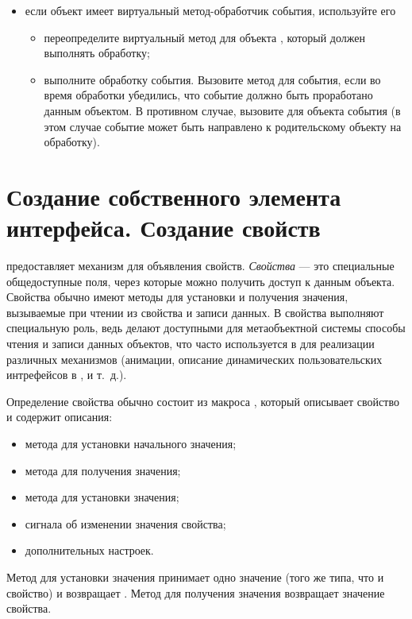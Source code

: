 \begin{itemize}
\item если объект имеет виртуальный метод-обработчик события, используйте его
 \begin{itemize}
 \item переопределите виртуальный метод для объекта , который должен выполнять обработку;
 \item выполните обработку события. Вызовите метод  для события, если во время обработки
 убедились, что событие должно быть проработано данным объектом. В противном случае, вызовите 
 для объекта события (в этом случае событие может быть направлено к родительскому объекту на обработку).
 \end{itemize}
\end{itemize}

\section[Создание собственного элемента интерфейса]{Создание собственного элемента интерфейса. Создание свойств}
 предоставляет механизм для объявления свойств.
\emph{Свойства} --- это специальные общедоступные поля, через которые
можно получить доступ к данным объекта. Свойства обычно имеют методы для установки и получения значения, вызываемые при
чтении из свойства и записи данных. В  свойства выполняют специальную роль, ведь делают доступными для метаобъектной
системы способы чтения и записи данных объектов, что часто используется в  для реализации различных механизмов
(анимации, описание динамических пользовательских интрефейсов в , и т.~д.).

Определение свойства обычно состоит из макроса , который описывает свойство и содержит описания:
\begin{itemize}
\item метода для установки начального значения;
\item метода для получения значения;
\item метода для установки значения;
\item сигнала об изменении значения свойства;
\item дополнительных настроек.
\end{itemize}

Метод для установки значения принимает одно значение (того же типа, что и свойство) и возвращает .
Метод для получения значения возвращает значение свойства.

